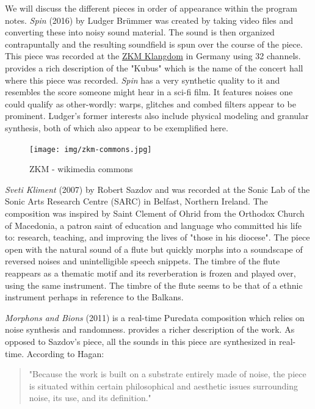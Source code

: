 We will discuss the different pieces in order of appearance within the program notes. \textit{Spin} (2016) by Ludger Brümmer was created by taking video files and converting these into noisy sound material. The sound is then organized contrapuntally and the resulting soundfield is spun over the course of the piece. This piece was recorded at the \href{https://zkm.de/en}{ZKM Klangdom} in Germany using 32 channels. \cite{ramakrishnan2006zkm} provides a rich description of the "Kubus" which is the name of the concert hall where this piece was recorded. \textit{Spin} has a very synthetic quality to it and resembles the score someone might hear in a sci-fi film. It features noises one could qualify as other-wordly: warps, glitches and combed filters appear to be prominent. Ludger's former interests also include physical modeling and granular synthesis, both of which also appear to be exemplified here. 

\begin{figure}[ht!]%
\centering
\texttt{[image: img/zkm-commons.jpg]} 
\caption{ZKM - wikimedia commons}
\end{figure}

\textit{Sveti Kliment} (2007) by Robert Sazdov and was recorded at the Sonic Lab of the Sonic Arts Research Centre (SARC) in Belfast, Northern Ireland. The composition was inspired by Saint Clement of Ohrid from the Orthodox Church of Macedonia, a patron saint of education and language who committed his life to: research, teaching, and improving the lives of "those in his diocese". The piece open with the natural sound of a flute but quickly morphs into a soundscape of reversed noises and unintelligible speech snippets. The timbre of the flute reappears as a thematic motif and its reverberation is frozen and played over, using the same instrument. The timbre of the flute seems to be that of a ethnic instrument perhaps in reference to the Balkans. 

\textit{Morphons and Bions} (2011) is a real-time Puredata composition which relies on noise synthesis and randomness. \cite{hagan2012aesthetic} provides a richer description of the work. As opposed to Sazdov's piece, all the sounds in this piece are synthesized in real-time. According to Hagan: 

\begin{quote}
    "Because the work is built on a substrate entirely made of noise, the piece is situated within certain philosophical and aesthetic issues surrounding noise, its use, and its definition."
\end{quote}

